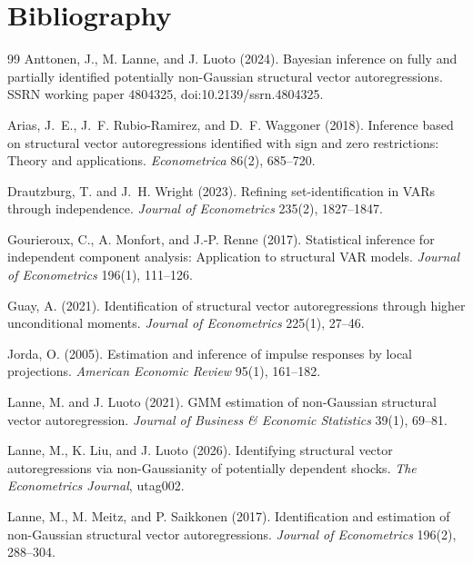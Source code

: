 \documentclass[11pt]{article}
\theoremstyle{definition}
\theoremstyle{plain}
\theoremstyle{remark}
\begin{document}
\section*{Bibliography}
\begin{thebibliography}{99}
Anttonen, J., M. Lanne, and J. Luoto (2024).
Bayesian inference on fully and partially identified potentially non-Gaussian structural vector autoregressions.
SSRN working paper 4804325, doi:10.2139/ssrn.4804325.

Arias, J.~E., J.~F. Rubio-Ramirez, and D.~F. Waggoner (2018).
Inference based on structural vector autoregressions identified with sign and zero restrictions: Theory and applications.
\emph{Econometrica} 86(2), 685--720.

Drautzburg, T. and J.~H. Wright (2023).
Refining set-identification in VARs through independence.
\emph{Journal of Econometrics} 235(2), 1827--1847.

Gourieroux, C., A. Monfort, and J.-P. Renne (2017).
Statistical inference for independent component analysis: Application to structural VAR models.
\emph{Journal of Econometrics} 196(1), 111--126.

Guay, A. (2021).
Identification of structural vector autoregressions through higher unconditional moments.
\emph{Journal of Econometrics} 225(1), 27--46.

Jorda, O. (2005).
Estimation and inference of impulse responses by local projections.
\emph{American Economic Review} 95(1), 161--182.

Lanne, M. and J. Luoto (2021).
GMM estimation of non-Gaussian structural vector autoregression.
\emph{Journal of Business \& Economic Statistics} 39(1), 69--81.

Lanne, M., K. Liu, and J. Luoto (2026).
Identifying structural vector autoregressions via non-Gaussianity of potentially dependent shocks.
\emph{The Econometrics Journal}, utag002.

Lanne, M., M. Meitz, and P. Saikkonen (2017).
Identification and estimation of non-Gaussian structural vector autoregressions.
\emph{Journal of Econometrics} 196(2), 288--304.


\end{thebibliography}
\end{document}
